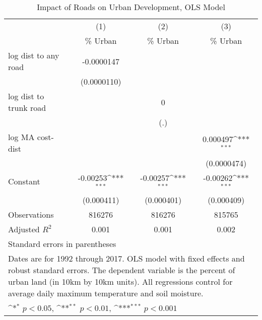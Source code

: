 \begin{table}[htbp]\centering
\def\sym#1{\ifmmode^{#1}\else\(^{#1}\)\fi}
\caption{Impact of Roads on Urban Development, OLS Model}
\begin{tabular}{l*{3}{c}}
\hline\hline
                    &\multicolumn{1}{c}{(1)}&\multicolumn{1}{c}{(2)}&\multicolumn{1}{c}{(3)}\\
                    &\multicolumn{1}{c}{\% Urban}&\multicolumn{1}{c}{\% Urban}&\multicolumn{1}{c}{\% Urban}\\
\hline
log dist to any road&  -0.0000147         &                     &                     \\
                    & (0.0000110)         &                     &                     \\
[1em]
log dist to trunk road&                     &           0         &                     \\
                    &                     &         (.)         &                     \\
[1em]
log MA cost-dist    &                     &                     &    0.000497\sym{***}\\
                    &                     &                     & (0.0000474)         \\
[1em]
Constant            &    -0.00253\sym{***}&    -0.00257\sym{***}&    -0.00262\sym{***}\\
                    &  (0.000411)         &  (0.000401)         &  (0.000409)         \\
\hline
Observations        &      816276         &      816276         &      815765         \\
Adjusted \(R^{2}\)  &       0.001         &       0.001         &       0.002         \\
\hline\hline
\multicolumn{4}{l}{\footnotesize Standard errors in parentheses}\\
\multicolumn{4}{l}{\footnotesize Dates are for 1992 through 2017. OLS model with fixed effects and robust standard errors. The dependent variable is the percent of urban land (in 10km by 10km units). All regressions control for average daily maximum temperature and soil moisture.}\\
\multicolumn{4}{l}{\footnotesize \sym{*} \(p<0.05\), \sym{**} \(p<0.01\), \sym{***} \(p<0.001\)}\\
\end{tabular}
\end{table}
